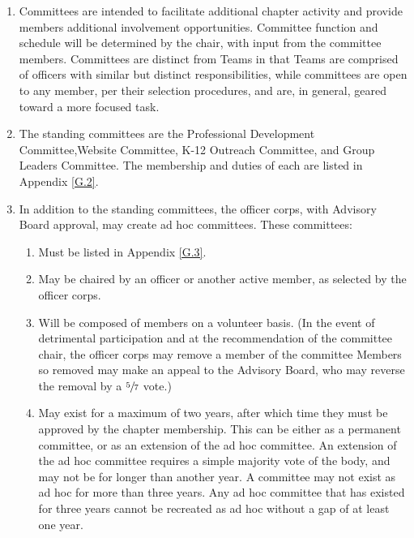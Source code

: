\begin{enumerate}
    \item {}
    Committees are intended to facilitate additional chapter activity and provide
members additional involvement opportunities. Committee function and schedule
will be determined by the chair, with input from the committee members. Committees
are distinct from Teams in that Teams are comprised of officers with similar
but distinct responsibilities, while committees are open to any member, per their selection
procedures, and are, in general, geared toward a more focused task.
    \item {}
    The standing committees are the Professional Development
Committee,Website Committee, K-12 Outreach Committee, and Group Leaders Committee.
The membership and duties of each are listed in Appendix \ref{G.2}.
    \item {}
    In addition to the standing committees, the officer corps, with
Advisory Board approval, may create ad hoc committees. These committees:
    \begin{enumerate}
        \item {}
        Must be listed in Appendix \ref{G.3}.
        \item {}
        May be chaired by an officer or another active member, as selected by the officer corps.
        \item {}
        Will be composed of members on a volunteer basis. (In the event of detrimental
participation and at the recommendation of the committee chair, the officer
corps may remove a member of the committee Members so removed may make
an appeal to the Advisory Board, who may reverse the removal by a $\sfrac{5}{7}$ vote.)
        \item {}May exist for a maximum of two years, after which time they must be approved
by the chapter membership. This can be either as a permanent committee, or
as an extension of the ad hoc committee. An extension of the ad hoc committee
requires a simple majority vote of the body, and may not be for longer than
another year. A committee may not exist as ad hoc for more than three years.
Any ad hoc committee that has existed for three years cannot be recreated as ad
hoc without a gap of at least one year.
    \end{enumerate}
\end{enumerate}


